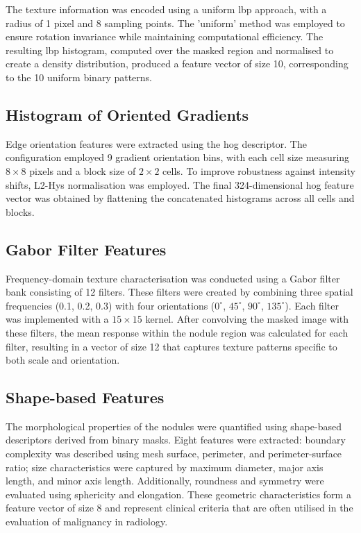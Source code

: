 The texture information was encoded using a uniform \ac{lbp} approach, with a radius of 1 pixel and 8 sampling points. The 'uniform' method was employed to ensure rotation invariance while maintaining computational efficiency. The resulting \ac{lbp} histogram, computed over the masked region and normalised to create a density distribution, produced a feature vector of size 10, corresponding to the 10 uniform binary patterns.

\subsection*{Histogram of Oriented Gradients}

Edge orientation features were extracted using the \ac{hog} descriptor. The configuration employed 9 gradient orientation bins, with each cell size measuring $8 \times 8$ pixels and a block size of $2 \times 2$ cells. To improve robustness against intensity shifts, L2-Hys normalisation was employed. The final 324-dimensional \ac{hog} feature vector was obtained by flattening the concatenated histograms across all cells and blocks.

\subsection*{Gabor Filter Features}

Frequency-domain texture characterisation was conducted using a Gabor filter bank consisting of 12 filters.
These filters were created by combining three spatial frequencies (0.1, 0.2, 0.3) with four orientations ($0^\circ$, $45^\circ$, $90^\circ$, $135^\circ$). Each filter was implemented with a $15 \times 15$ kernel. After convolving the masked image with these filters, the mean response within the nodule region was calculated for each filter, resulting in a vector of size 12 that captures texture patterns specific to both scale and orientation.

\subsection*{Shape-based Features}

The morphological properties of the nodules were quantified using shape-based descriptors derived from binary masks. Eight features were extracted: boundary complexity was described using mesh surface, perimeter, and perimeter-surface ratio; size characteristics were captured by maximum diameter, major axis length, and minor axis length. Additionally, roundness and symmetry were evaluated using sphericity and elongation. These geometric characteristics form a feature vector of size 8 and represent clinical criteria that are often utilised in the evaluation of malignancy in radiology.

